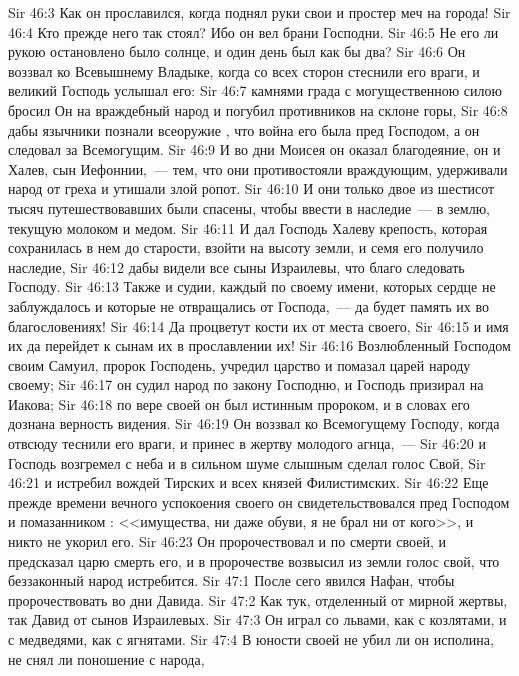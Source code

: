 \vs Sir 46:3 Как он прославился, когда поднял руки свои и простер меч на города!
\vs Sir 46:4 Кто прежде него так стоял? Ибо он вел брани Господни.
\vs Sir 46:5 Не его ли рукою остановлено было солнце, и один день был как бы два?
\vs Sir 46:6 Он воззвал ко Всевышнему Владыке, когда со всех сторон стеснили его враги, и великий Господь услышал его:
\vs Sir 46:7 камнями града с могущественною силою бросил Он на враждебный народ и погубил противников на склоне горы,
\vs Sir 46:8 дабы язычники познали всеоружие , что война его была пред Господом, а он  следовал за Всемогущим.
\vs Sir 46:9 И во дни Моисея он оказал благодеяние, он и Халев, сын Иефоннии,~--- тем, что они противостояли враждующим, удерживали народ от греха и утишали злой ропот.
\vs Sir 46:10 И они только двое из шестисот тысяч путешествовавших были спасены, чтобы ввести  в наследие~--- в землю, текущую молоком и медом.
\vs Sir 46:11 И дал Господь Халеву крепость, которая сохранилась в нем до старости, взойти на высоту земли, и семя его получило наследие,
\vs Sir 46:12 дабы видели все сыны Израилевы, что благо следовать Господу.
\vs Sir 46:13 Также и судии, каждый по своему имени, которых сердце не заблуждалось и которые не отвращались от Господа,~--- да будет память их во благословениях!
\vs Sir 46:14 Да процветут кости их от места своего,
\vs Sir 46:15 и имя их да перейдет к сынам их в прославлении их!
\vs Sir 46:16 Возлюбленный Господом своим Самуил, пророк Господень, учредил царство и помазал царей народу своему;
\vs Sir 46:17 он судил народ по закону Господню, и Господь призирал на Иакова;
\vs Sir 46:18 по вере своей он был истинным пророком, и в словах его дознана верность видения.
\vs Sir 46:19 Он воззвал ко Всемогущему Господу, когда отвсюду теснили его враги, и принес в жертву молодого агнца,~---
\vs Sir 46:20 и Господь возгремел с неба и в сильном шуме слышным сделал голос Свой,
\vs Sir 46:21 и истребил вождей Тирских и всех князей Филистимских.
\vs Sir 46:22 Еще прежде времени вечного успокоения своего он свидетельствовался пред Господом и помазанником : <<имущества, ни даже обуви, я не брал ни от кого>>, и никто не укорил его.
\vs Sir 46:23 Он пророчествовал и по смерти своей, и предсказал царю смерть его, и в пророчестве возвысил из земли голос свой, что беззаконный народ истребится.
\vs Sir 47:1 После сего явился Нафан, чтобы пророчествовать во дни Давида.
\vs Sir 47:2 Как тук, отделенный от мирной жертвы, так Давид от сынов Израилевых.
\vs Sir 47:3 Он играл со львами, как с козлятами, и с медведями, как с ягнятами.
\vs Sir 47:4 В юности своей не убил ли он исполина, не снял ли поношение с народа,
